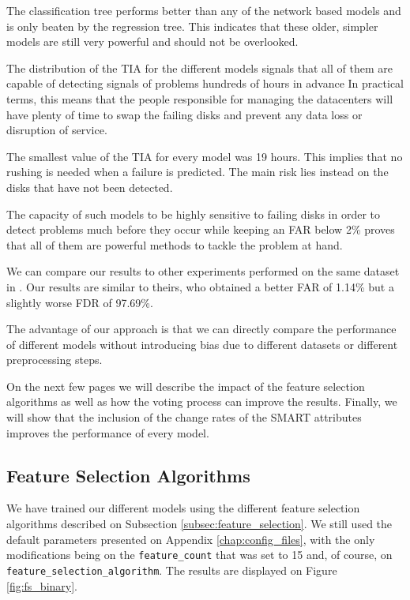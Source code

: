 The classification tree performs better than any of the network based models and is only beaten by the regression tree.
This indicates that these older, simpler models are still very powerful and should not be overlooked.

The distribution of the TIA for the different models signals that all of them are capable of detecting signals of problems hundreds of hours in advance
In practical terms, this means that the people responsible for managing the datacenters will have plenty of time to swap the failing disks and prevent any data loss or disruption of service.

The smallest value of the TIA for every model was 19 hours.
This implies that no rushing is needed when a failure is predicted.
The main risk lies instead on the disks that have not been detected.

The capacity of such models to be highly sensitive to failing disks in order to detect problems much before they occur while keeping an FAR below 2\% proves that all of them are powerful methods to tackle the problem at hand.

We can compare our results to other experiments performed on the same dataset in \cite{Zhu13}.
Our results are similar to theirs, who obtained a better FAR of 1.14\% but a slightly worse FDR of 97.69\%.

The advantage of our approach is that we can directly compare the performance of different models without introducing bias due to different datasets or different preprocessing steps.

On the next few pages we will describe the impact of the feature selection algorithms as well as how the voting process can improve the results.
Finally, we will show that the inclusion of the change rates of the SMART attributes improves the performance of every model.

\subsection{Feature Selection Algorithms}

We have trained our different models using the different feature selection algorithms described on Subsection \ref{subsec:feature_selection}.
We still used the default parameters presented on Appendix \ref{chap:config_files}, with the only modifications being on the \verb|feature_count| that was set to 15 and, of course, on \verb|feature_selection_algorithm|.
The results are displayed on Figure \ref{fig:fs_binary}.

